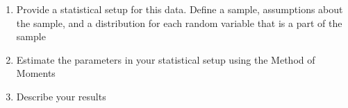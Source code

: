 \begin{enumerate}
    \begin{enumerate}
        \item Provide a statistical setup for this data. Define a sample, assumptions about the sample, and a distribution for each random variable that is a part of the sample
        \item Estimate the parameters in your statistical setup using the Method of Moments
        \item Describe your results
    \end{enumerate}
    
\end{enumerate}